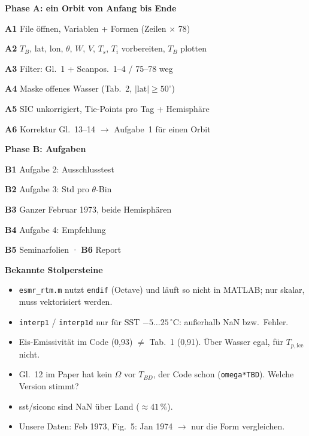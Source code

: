 \documentclass[10pt,a4paper]{article}
\newcommand{\blank}[1][22mm]{\makebox[#1]{\hrulefill}}
\newcommand{\Tpi}{T_{p,\mathrm{ice}}}
\begin{document}
\begin{minipage}[t]{0.47\linewidth}
\textbf{Phase A: ein Orbit von Anfang bis Ende}
\begin{chk}\small
\item[$\boxtimes$] \textbf{A1} File öffnen, Variablen + Formen (Zeilen \(\times\) 78)
\item[$\boxtimes$] \textbf{A2} \(T_B\), lat, lon, \(\theta\), \(W\), \(V\), \(T_s\), \(T_i\) vorbereiten, \(T_B\) plotten
\item \textbf{A3} Filter: Gl.~1 + Scanpos.\ 1--4 / 75--78 weg
\item \textbf{A4} Maske offenes Wasser (Tab.~2, \(|\mathrm{lat}|\ge 50^\circ\))
\item \textbf{A5} SIC unkorrigiert, Tie-Points pro Tag + Hemisphäre
\item \textbf{A6} Korrektur Gl.~13--14 \(\rightarrow\) Aufgabe~1 für einen Orbit
\end{chk}
\vspace{2mm}
\textbf{Phase B: Aufgaben}
\begin{chk}\small
\item \textbf{B1} Aufgabe 2: Ausschlusstest
\item \textbf{B2} Aufgabe 3: Std pro \(\theta\)-Bin
\item \textbf{B3} Ganzer Februar 1973, beide Hemisphären
\item \textbf{B4} Aufgabe 4: Empfehlung
\item \textbf{B5} Seminarfolien · \textbf{B6} Report
\end{chk}
\end{minipage}\hfill
\begin{minipage}[t]{0.5\linewidth}
\textbf{Bekannte Stolpersteine}
\begin{itemize}\footnotesize
\item \texttt{esmr\_rtm.m} nutzt \texttt{endif} (Octave) und läuft so nicht in MATLAB; nur skalar, muss vektorisiert werden.
\item \texttt{interp1} / \texttt{interp1d} nur für SST \(-5\dots25\,^\circ\)C: außerhalb NaN bzw.\ Fehler.
\item Eis-Emissivität im Code (0{,}93) \(\neq\) Tab.~1 (0{,}91). Über Wasser egal, für \(\Tpi\) nicht.
\item Gl.~12 im Paper hat kein \(\Omega\) vor \(T_{BD}\), der Code schon (\texttt{omega*TBD}). Welche Version stimmt? \blank[20mm]
\item sst/siconc sind NaN über Land (\(\approx 41\,\%\)).
\item Unsere Daten: Feb 1973, Fig.~5: Jan 1974 \(\rightarrow\) nur die Form vergleichen.
\end{itemize}
\end{minipage}
\end{document}
